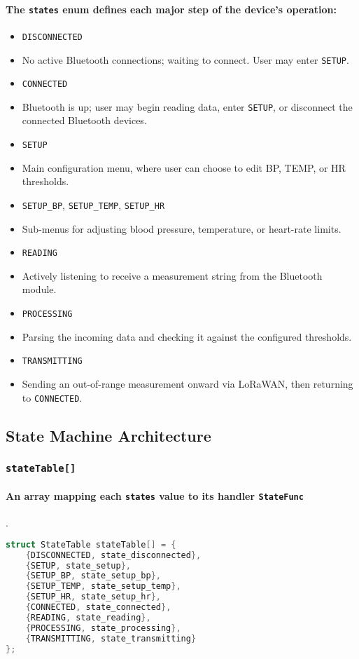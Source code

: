 \paragraph{The \lstinline|states| enum defines each major step of the device's operation:}
\begin{itemize}
	\item \lstinline|DISCONNECTED|
	\item[] No active Bluetooth connections; waiting to connect. User may enter \lstinline|SETUP|.
	\item \lstinline|CONNECTED|
	\item[] Bluetooth is up; user may begin reading data, enter \lstinline|SETUP|, or disconnect the connected Bluetooth devices.
	\item \lstinline|SETUP|
	\item[] Main configuration menu, where user can choose to edit BP, TEMP, or HR thresholds.
	\item \lstinline|SETUP_BP|, \lstinline|SETUP_TEMP|, \lstinline|SETUP_HR|
	\item[] Sub-menus for adjusting blood pressure, temperature, or heart-rate limits.
	\item \lstinline|READING|
	\item[] Actively listening to receive a measurement string from the Bluetooth module.
	\item \lstinline|PROCESSING|
	\item[] Parsing the incoming data and checking it against the configured thresholds.
	\item \lstinline|TRANSMITTING|
	\item[] Sending an out-of-range measurement onward via LoRaWAN, then returning to \lstinline|CONNECTED|.
\end{itemize}

\subsection{State Machine Architecture}
\subsubsection{\lstinline|stateTable[]|}
\paragraph{An array mapping each \lstinline|states| value to its handler \lstinline|StateFunc|}.
\begin{lstlisting}[language=C++]
struct StateTable stateTable[] = {
	{DISCONNECTED, state_disconnected},
	{SETUP, state_setup},
	{SETUP_BP, state_setup_bp},
	{SETUP_TEMP, state_setup_temp},
	{SETUP_HR, state_setup_hr},
	{CONNECTED, state_connected},
	{READING, state_reading},
	{PROCESSING, state_processing},
	{TRANSMITTING, state_transmitting}
};
\end{lstlisting}

